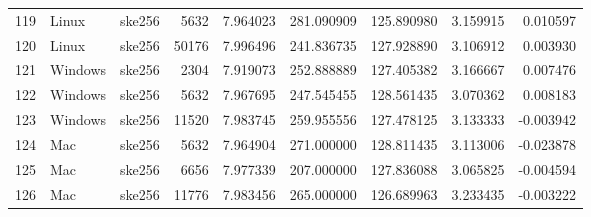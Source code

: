 \documentclass{IEEEtran}
\begin{document}
\begin{longtable}{rllrrrrrr}
  119 & Linux & ske256 &    5632 & 7.964023 & 281.090909 & 125.890980 & 3.159915 & 0.010597 \\ 
  120 & Linux & ske256 &   50176 & 7.996496 & 241.836735 & 127.928890 & 3.106912 & 0.003930 \\ 
  121 & Windows & ske256 &    2304 & 7.919073 & 252.888889 & 127.405382 & 3.166667 & 0.007476 \\ 
  122 & Windows & ske256 &    5632 & 7.967695 & 247.545455 & 128.561435 & 3.070362 & 0.008183 \\ 
  123 & Windows & ske256 &   11520 & 7.983745 & 259.955556 & 127.478125 & 3.133333 & -0.003942 \\ 
  124 & Mac & ske256 &    5632 & 7.964904 & 271.000000 & 128.811435 & 3.113006 & -0.023878 \\ 
  125 & Mac & ske256 &    6656 & 7.977339 & 207.000000 & 127.836088 & 3.065825 & -0.004594 \\ 
  126 & Mac & ske256 &   11776 & 7.983456 & 265.000000 & 126.689963 & 3.233435 & -0.003222 \\ 
  \hline
\end{longtable}
\end{document}
